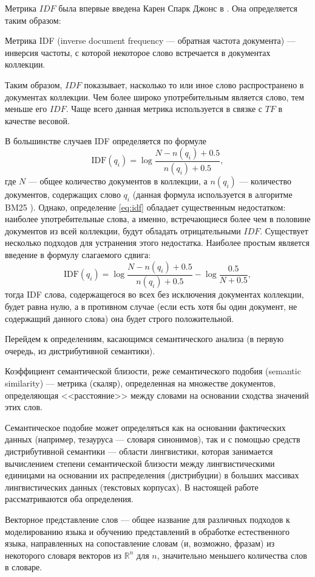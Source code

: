 Метрика $IDF$ была впервые введена Карен Спарк Джонс в \cite{jones2004statistical}. Она определяется таким образом:
\begin{defn}
    Метрика IDF (inverse document frequency --- обратная частота документа) --- инверсия частоты, с которой некоторое слово
    встречается в документах коллекции.
\end{defn}
Таким образом, $IDF$ показывает, насколько то или иное слово распространено в документах коллекции. Чем более широко употребительным
является слово, тем меньше его $IDF$. Чаще всего данная метрика используется в связке с $TF$ в качестве весовой.

В большинстве случаев IDF определяется по формуле
\begin{equation}
    \label{eq:idf}
    \text{IDF}(q_i) = \log \frac{N - n(q_i) + 0.5}{n(q_i) + 0.5},
\end{equation}
где $N$ --- общее количество документов в коллекции, а $n(q_i)$ --- количество документов, содержащих слово $q_i$
(данная формула используется в алгоритме BM25 \cite{Amati2009}). Однако, определение \eqref{eq:idf} обладает существенным недостатком:
наиболее употребительные слова, а именно, встречающиеся более чем в половине документов из всей коллекции, будут обладать
отрицательными $IDF$. Существует несколько подходов для устранения этого недостатка. Наиболее простым является введение в формулу
слагаемого сдвига:
\begin{equation}
    \label{eq:shifted-idf}
    \text{IDF}(q_i) = \log \frac{N - n(q_i) + 0.5}{n(q_i) + 0.5} - \log\frac{0.5}{N + 0.5},
\end{equation}
тогда IDF слова, содержащегося во всех без исключения документах коллекции, будет равна нулю, а в противном случае (если есть
хотя бы один документ, не содержащий данного слова) она будет строго положительной.

Перейдем к определениям, касающимся семантического анализа (в первую очередь, из дистрибутивной семантики).
\begin{defn}
    Коэффициент семантической близости, реже семантического подобия (semantic similarity) --- метрика (скаляр), определенная
    на множестве документов, определяющая <<расстояние>> между словами на основании сходства значений этих слов.
\end{defn}

Семантическое подобие может определяться как на основании фактических данных (например, тезауруса --- словаря синонимов),
так и с помощью средств дистрибутивной семантики --- области лингвистики, которая занимается вычислением степени
семантической близости между лингвистическими единицами на основании их распределения (дистрибуции) в больших массивах
лингвистических данных (текстовых корпусах). В настоящей работе рассматриваются оба определения.

\begin{defn}
    Векторное представление слов --- общее название для различных подходов к моделированию языка и обучению представлений
    в обработке естественного языка, направленных на сопоставление словам (и, возможно, фразам) из некоторого словаря
    векторов из $\mathbb{R}^{n}$ для $n$, значительно меньшего количества слов в словаре.
\end{defn}